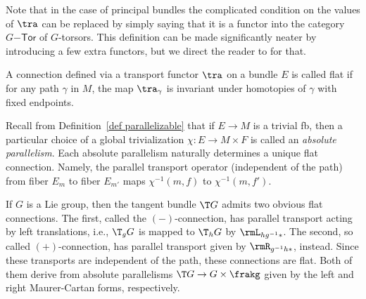 Note that in the case of principal bundles the complicated condition on the values of $\tra$ can be replaced by simply saying that it is a functor into the category $G\mathsf{-Tor}$ of $G$-torsors. This definition can be made significantly neater by introducing a few extra functors, but we direct the reader to \cite{schreiber} for that.

\begin{defn}
    A connection defined via a transport functor $\tra$ on a bundle $E$ is called flat if for any path $\gamma$ in $M$, the map $\tra_\gamma$ is invariant under homotopies of $\gamma$ with fixed endpoints.
\end{defn}


\begin{example}
    Recall from Definition~\ref{def parallelizable} that if $E\to M$ is a trivial \gls{fb}, then a particular choice of a global trivialization $\chi:E\to M\times F$ is called an \emph{absolute parallelism}. Each absolute parallelism naturally determines a unique flat connection. Namely, the parallel transport operator (independent of the path) from fiber $E_m$ to fiber $E_{m'}$ maps $\chi^{-1}(m,f)$ to $\chi^{-1}(m,f')$.
\end{example}

\begin{example}\label{ex flat connections on G}
    If $G$ is a Lie group, then the tangent bundle $\T G$ admits two obvious flat connections. The first, called the $(-)$-connection, has parallel transport acting by left translations, i.e., $\T_g G$ is mapped to $\T_h G$ by $\rmL_{hg^{-1}\ast}$. The second, so called $(+)$-connection, has parallel transport given by $\rmR_{g^{-1}h\ast}$, instead. Since these transports are independent of the path, these connections are flat. Both of them derive from absolute parallelisms $\T G\to G\times\frakg$ given by the left and right Maurer-Cartan forms, respectively.
\end{example}



